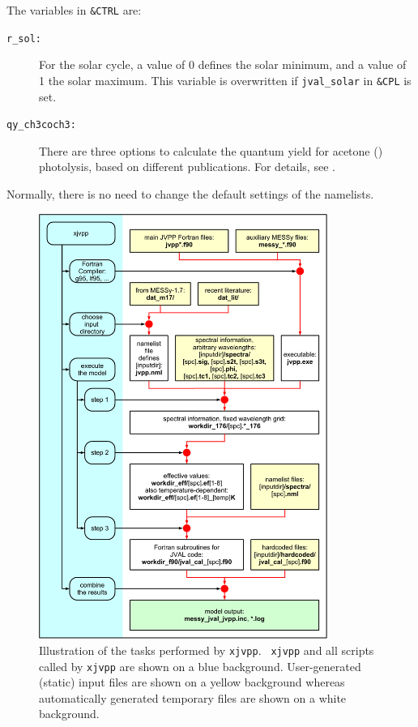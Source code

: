 \documentclass[a4paper,twoside]{article}
\begin{document}
The variables in \verb|&CTRL| are:

\begin{description}
\item[\tt r\_sol:] For the solar cycle, a value of 0 defines the solar
  minimum, and a value of 1 the solar maximum. This variable is
  overwritten if {\tt jval\_solar} in \verb|&CPL| is set.
\item[\tt qy\_ch3coch3:] There are three options to calculate the
  quantum yield for acetone () photolysis, based on
  different publications. For details, see
  .
\end{description}

Normally, there is no need to change the default settings of the
namelists.

\begin{figure}[tbh]
  \begin{center}
  \includegraphics[width=0.84\textwidth]{flowcontrol_xjvpp}
  \end{center}
  \caption{Illustration of the tasks performed by {\tt xjvpp}. {\tt
      xjvpp} and all scripts called by {\tt xjvpp} are shown on a blue
    background. User-generated (static) input files are shown on a
    yellow background whereas automatically generated temporary files
    are shown on a white background.}
  \label{fig:flowcontrol_xjvpp}
\end{figure}
\end{document}
